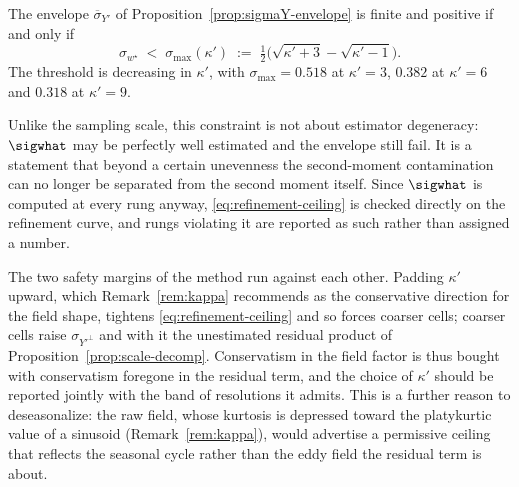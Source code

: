 \begin{lemma}
\label{lem:refinement-ceiling}
The envelope $\overline{\sigma}_{Y'}$ of
Proposition~\ref{prop:sigmaY-envelope} is finite and positive if and only
if
\begin{equation}
  \sigma_{w^{\star}}
  \;<\;\sigma_{\max}(\kappa')
  \;:=\;\tfrac12\Big(\sqrt{\kappa'+3}-\sqrt{\kappa'-1}\Big).
  \label{eq:refinement-ceiling}
\end{equation}
The threshold is decreasing in $\kappa'$, with
$\sigma_{\max}=0.518$ at $\kappa'=3$, $0.382$ at $\kappa'=6$ and $0.318$
at $\kappa'=9$.
\end{lemma}

Unlike the sampling scale, this constraint is not about estimator
degeneracy: $\sigwhat$ may be perfectly well estimated and the envelope
still fail. It is a statement that beyond a certain unevenness the
second-moment contamination can no longer be separated from the
second moment itself. Since $\sigwhat$ is computed at every rung anyway,
\eqref{eq:refinement-ceiling} is checked directly on the refinement
curve, and rungs violating it are reported as such rather than assigned a
number.

\begin{remark}
\label{rem:kappa-resolution}
The two safety margins of the method run against each other. Padding
$\kappa'$ upward, which Remark~\ref{rem:kappa} recommends as the
conservative direction for the field shape, tightens
\eqref{eq:refinement-ceiling} and so forces coarser cells; coarser cells
raise $\sigma_{Y'^{\perp}}$ and with it the unestimated residual product
of Proposition~\ref{prop:scale-decomp}. Conservatism in the field factor
is thus bought with conservatism foregone in the residual term, and the
choice of $\kappa'$ should be reported jointly with the band of
resolutions it admits. This is a further reason to deseasonalize: the raw
field, whose kurtosis is depressed toward the platykurtic value of a
sinusoid (Remark~\ref{rem:kappa}), would advertise a permissive ceiling
that reflects the seasonal cycle rather than the eddy field the residual
term is about.
\end{remark}

